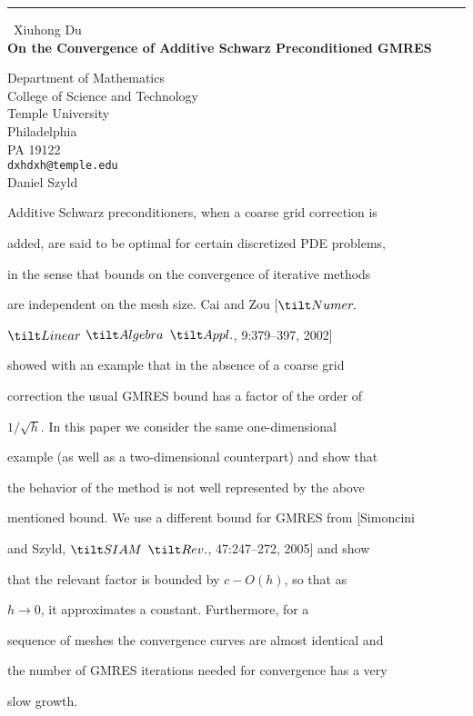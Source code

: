 \documentclass{report}
\begin{document}
\begin{center}
\rule{6in}{1pt} \
{\large Xiuhong Du \\
{\bf On the Convergence of Additive Schwarz Preconditioned GMRES}}

Department of Mathematics \\ College of Science and Technology \\ Temple University \\ Philadelphia \\ PA 19122
\\
{\tt dxhdxh@temple.edu}\\
Daniel Szyld\end{center}



Additive Schwarz preconditioners, when a coarse grid correction is

added, are said to be optimal for certain discretized PDE problems,

in the sense that bounds on the convergence of iterative methods

are independent on the mesh size. Cai and Zou [$\tilt Numer.$

$\tilt Linear$ $\tilt Algebra$ $\tilt Appl.$, 9:379--397, 2002]

showed with an example that in the absence of a coarse grid

correction the usual GMRES bound has a factor of the order of

$1/\sqrt h$. In this paper we consider the same one-dimensional

example (as well as a two-dimensional counterpart) and show that

the behavior of the method is not well represented by the above

mentioned bound. We use a different bound for GMRES from [Simoncini

and Szyld, $\tilt SIAM$ $\tilt Rev.$, 47:247--272, 2005] and show

that the relevant factor is bounded by $c-O(h)$, so that as

$h\rightarrow 0$, it approximates a constant. Furthermore, for a

sequence of meshes the convergence curves are almost identical and

the number of GMRES iterations needed for convergence has a very

slow growth.
\end{document}
